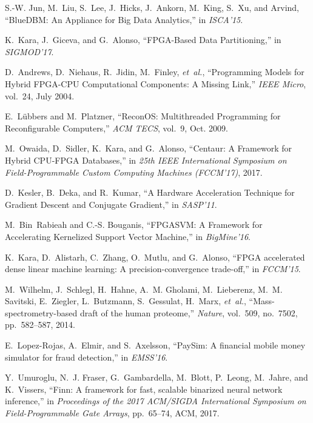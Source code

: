 \documentclass[11pt,dvipdfm]{article}
\begin{document}
\begin{thebibliography}{10}
\begin{small}
S.-W. Jun, M.~Liu, S.~Lee, J.~Hicks, J.~Ankorn, M.~King, S.~Xu, and Arvind,
  ``{BlueDBM: An Appliance for Big Data Analytics},'' in {\em ISCA'15}.

K.~Kara, J.~Giceva, and G.~Alonso, ``{FPGA-Based Data Partitioning},'' in {\em
  SIGMOD'17}.

D.~Andrews, D.~Niehaus, R.~Jidin, M.~Finley, {\em et~al.}, ``{Programming
  Models for Hybrid {FPGA-CPU} Computational Components: A Missing Link},''
  {\em IEEE Micro}, vol.~24, July 2004.

E.~L\"ubbers and M.~Platzner, ``{{ReconOS}: Multithreaded Programming for
  Reconfigurable Computers},'' {\em ACM TECS}, vol.~9, Oct. 2009.

M.~Owaida, D.~Sidler, K.~Kara, and G.~Alonso, ``{Centaur: A Framework for
  Hybrid CPU-FPGA Databases},'' in {\em 25th IEEE International Symposium on
  Field-Programmable Custom Computing Machines (FCCM'17)}, 2017.

D.~Kesler, B.~Deka, and R.~Kumar, ``{A Hardware Acceleration Technique for
  Gradient Descent and Conjugate Gradient},'' in {\em SASP'11}.

M.~Bin~Rabieah and C.-S. Bouganis, ``{FPGASVM: A Framework for Accelerating
  Kernelized Support Vector Machine},'' in {\em BigMine'16}.

K.~Kara, D.~Alistarh, C.~Zhang, O.~Mutlu, and G.~Alonso, ``{FPGA accelerated
  dense linear machine learning: A precision-convergence trade-off},'' in {\em
  FCCM'15}.

M.~Wilhelm, J.~Schlegl, H.~Hahne, A.~M. Gholami, M.~Lieberenz, M.~M. Savitski,
  E.~Ziegler, L.~Butzmann, S.~Gessulat, H.~Marx, {\em et~al.},
  ``{Mass-spectrometry-based draft of the human proteome},'' {\em Nature},
  vol.~509, no.~7502, pp.~582--587, 2014.

E.~Lopez-Rojas, A.~Elmir, and S.~Axelsson, ``{PaySim: A financial mobile money
  simulator for fraud detection},'' in {\em EMSS'16}.

Y.~Umuroglu, N.~J. Fraser, G.~Gambardella, M.~Blott, P.~Leong, M.~Jahre, and
  K.~Vissers, ``{Finn: A framework for fast, scalable binarized neural network
  inference},'' in {\em Proceedings of the 2017 ACM/SIGDA International
  Symposium on Field-Programmable Gate Arrays}, pp.~65--74, ACM, 2017.


\end{small}
\end{thebibliography}
\end{document}

